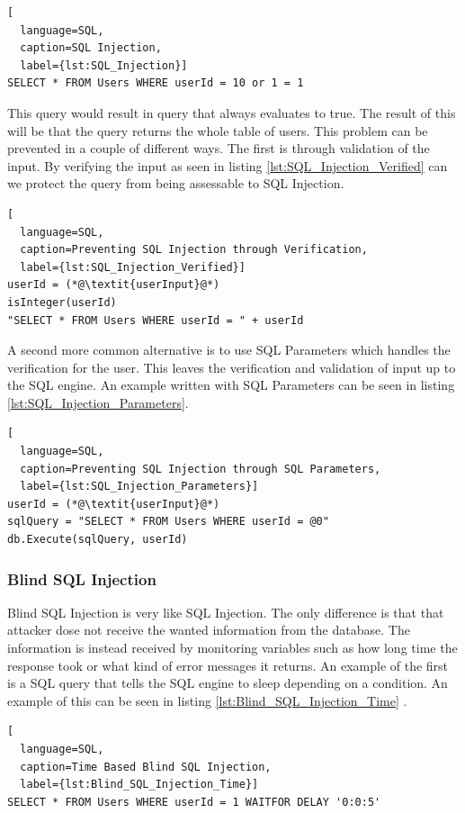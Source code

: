 \hfill
\begin{lstlisting}[
  language=SQL,
  caption=SQL Injection,
  label={lst:SQL_Injection}]
SELECT * FROM Users WHERE userId = 10 or 1 = 1
\end{lstlisting}
\hfill

This query would result in query that always evaluates to true. The result of this will be that the query returns the whole table of users. This problem can be prevented in a couple of different ways. The first is through validation of the input. By verifying the input as seen in listing \ref{lst:SQL_Injection_Verified} can we protect the query from being assessable to SQL Injection.

\hfill
\begin{lstlisting}[
  language=SQL,
  caption=Preventing SQL Injection through Verification,
  label={lst:SQL_Injection_Verified}]
userId = (*@\textit{userInput}@*)
isInteger(userId)
"SELECT * FROM Users WHERE userId = " + userId
\end{lstlisting}
\hfill

A second more common alternative is to use SQL Parameters which handles the verification for the user. This leaves the verification and validation of input up to the SQL engine. An example written with SQL Parameters can be seen in listing \ref{lst:SQL_Injection_Parameters}.

\hfill
\begin{lstlisting}[
  language=SQL,
  caption=Preventing SQL Injection through SQL Parameters,
  label={lst:SQL_Injection_Parameters}]
userId = (*@\textit{userInput}@*)
sqlQuery = "SELECT * FROM Users WHERE userId = @0"
db.Execute(sqlQuery, userId)
\end{lstlisting}


\subsubsection{Blind SQL Injection}
Blind SQL Injection is very like SQL Injection. The only difference is that that attacker dose not receive the wanted information from the database. The information is instead received by monitoring variables such as how long time the response took or what kind of error messages it returns. An example of the first is a SQL query that tells the SQL engine to sleep depending on a condition. An example of this can be seen in listing \ref{lst:Blind_SQL_Injection_Time} \parencite{JustinClarke-Salt2009SIAa, Secure_Web}.

\hfill
\begin{lstlisting}[
  language=SQL,
  caption=Time Based Blind SQL Injection,
  label={lst:Blind_SQL_Injection_Time}]
SELECT * FROM Users WHERE userId = 1 WAITFOR DELAY '0:0:5'
\end{lstlisting}
\hfill

